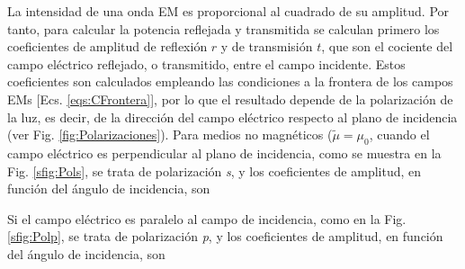 La intensidad de una onda EM es proporcional al cuadrado de su amplitud. Por tanto, para calcular  la potencia  reflejada y transmitida se calculan primero los coeficientes de amplitud de reflexión $r$ y de transmisión $t$, que son el cociente del campo eléctrico reflejado, o transmitido, entre el campo incidente. Estos coeficientes son calculados empleando las condiciones a la frontera de los campos EMs [Ecs. \eqref{eqs:CFrontera}], por lo que el resultado depende de la polarización de la luz, es decir, de la dirección del campo eléctrico respecto al plano de incidencia (ver Fig. \ref{fig:Polarizaciones}). Para medios no magnéticos ($\tilde{\mu}=\mu_0$, cuando el campo eléctrico es perpendicular al plano de incidencia, como se muestra en la Fig. \ref{sfig:Pols}, se trata  de polarización \emph{s}, y los coeficientes de amplitud, en función del ángulo de incidencia, son 
	\begin{tcolorbox}[title = Coeficientes de amplitud para polarización \emph{s} ]
\vspace*{-1em}	
	\end{tcolorbox}	 \vspace*{-1em}\noindent
Si el campo eléctrico es paralelo al campo de incidencia, como en la Fig. \ref{sfig:Polp}, se trata de polarización \emph{p}, y los coeficientes de amplitud, en función del ángulo de incidencia, son 
	\begin{tcolorbox}[title = Coeficientes de amplitud para polarización \emph{p} ]
\vspace*{-1.5em}	
	\end{tcolorbox}	 \vspace*{-1em}\noindent


